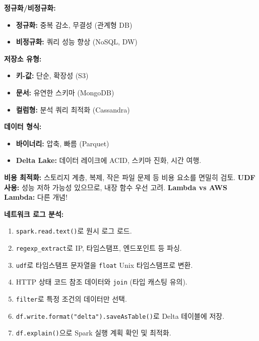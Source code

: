 \documentclass[11pt,a4paper]{article}
\theoremstyle{definition}
\begin{document}
\begin{tcolorbox}[conceptbox, title={데이터 저장소 및 형식}]
\textbf{정규화/비정규화:}
\begin{itemize}
    \item \textbf{정규화:} 중복 감소, 무결성 (관계형 DB)
    \item \textbf{비정규화:} 쿼리 성능 향상 (NoSQL, DW)
\end{itemize}
\textbf{저장소 유형:}
\begin{itemize}
    \item \textbf{키-값:} 단순, 확장성 (S3)
    \item \textbf{문서:} 유연한 스키마 (MongoDB)
    \item \textbf{컬럼형:} 분석 쿼리 최적화 (Cassandra)
\end{itemize}
\textbf{데이터 형식:}
\begin{itemize}
    \item \textbf{바이너리:} 압축, 빠름 (Parquet)
    \item \textbf{Delta Lake:} 데이터 레이크에 ACID, 스키마 진화, 시간 여행.
\end{itemize}
\end{tcolorbox}

\begin{tcolorbox}[warningbox, title={주의 사항}]
\textbf{비용 최적화:} 스토리지 계층, 복제, 작은 파일 문제 등 비용 요소를 면밀히 검토.
\textbf{UDF 사용:} 성능 저하 가능성 있으므로, 내장 함수 우선 고려.
\textbf{Lambda vs AWS Lambda:} 다른 개념!
\end{tcolorbox}

\begin{tcolorbox}[examplebox, title={실습 요약 (Lab 02)}]
\textbf{네트워크 로그 분석:}
\begin{enumerate}
    \item \texttt{spark.read.text()}로 원시 로그 로드.
    \item \texttt{regexp_extract}로 IP, 타임스탬프, 엔드포인트 등 파싱.
    \item \texttt{udf}로 타임스탬프 문자열을 \texttt{float} Unix 타임스탬프로 변환.
    \item HTTP 상태 코드 참조 데이터와 \texttt{join} (타입 캐스팅 유의).
    \item \texttt{filter}로 특정 조건의 데이터만 선택.
    \item \texttt{df.write.format("delta").saveAsTable()}로 Delta 테이블에 저장.
    \item \texttt{df.explain()}으로 Spark 실행 계획 확인 및 최적화.
\end{enumerate}
\end{tcolorbox}
\end{document}
